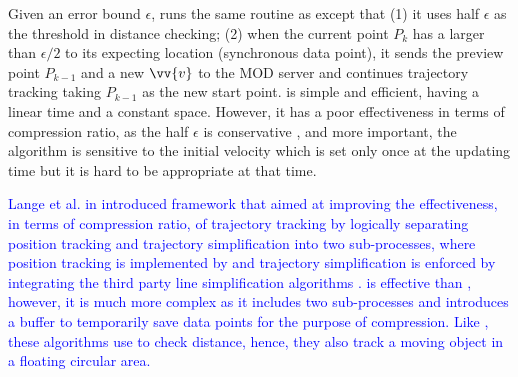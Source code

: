 Given an error bound $\epsilon$, \ldrh runs the same routine as \ldr except that (1) it uses half $\epsilon$ as the threshold in distance checking; (2) when the current point $P_k$ has a \sed larger than $\epsilon/2$ to its expecting location (synchronous data point), it sends the preview point $P_{k-1}$ and a new $\vv{v}$ to the MOD server and continues trajectory tracking taking $P_{k-1}$ as the new start point. \ldrh is simple and efficient, having a linear time and a constant space. However, it has a poor effectiveness in terms of compression ratio, as the half $\epsilon$ is conservative \cite{Lange:Tracking}, and more important, the algorithm is sensitive to the initial velocity which is set only once at the updating time but it is hard to be appropriate at that time.
 
\textcolor{blue}{ 
Lange et al. in \cite{Lange:GRTS, Lange:Tracking} introduced \grts framework that aimed at improving the effectiveness, in terms of compression ratio, of trajectory tracking by logically separating position tracking and trajectory simplification into two sub-processes, where position tracking is implemented by \ldr and trajectory simplification is enforced by integrating the third party line simplification algorithms \cite{Zhang:Evaluation, Lin:Cised}. \grts is effective than \ldrh, however, it is much more complex as it includes two sub-processes and introduces a buffer to temporarily save data points for the purpose of compression.
Like \ldr, these algorithms use \sed to check distance, hence, they also track a moving object in a floating circular area.
}


